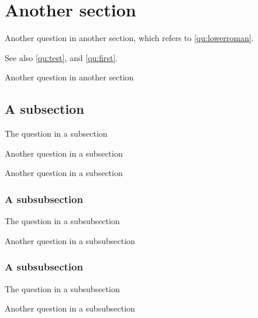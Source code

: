 \documentclass{article}
\newcounter{question}
\begin{document}
    \section{Another section}

    \begin{question}
        Another question in another section, which refers to
        \ref{qu:lowerroman}.
    \end{question}

    See also \ref{qu:test}, and \ref{qu:first}.

    \begin{question}
        Another question in another section
    \end{question}

    \subsection{A subsection}

    \begin{question}
        The question in a subsection
    \end{question}

    \begin{question}
        Another question in a subsection
    \end{question}

    \begin{question}
        Another question in a subsection
    \end{question}

    \subsubsection{A subsubsection}

    \begin{question}
        The question in a subsubsection
    \end{question}

    \begin{question}
        Another question in a subsubsection
    \end{question}

    \subsubsection{A subsubsection}

    \begin{question}
        The question in a subsubsection
    \end{question}

    \begin{question}
        Another question in a subsubsection
    \end{question}

    
\end{document}
